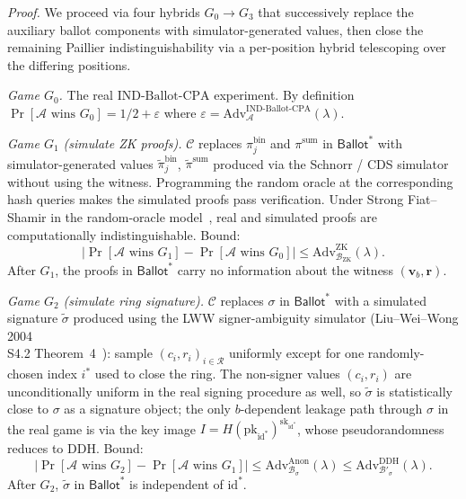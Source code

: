 \textit{Proof.} We proceed via four hybrids $G_0 \to G_3$ that successively replace the auxiliary ballot components with simulator-generated values, then close the remaining Paillier indistinguishability via a per-position hybrid telescoping over the differing positions.

\emph{Game $G_0$.} The real $\mathrm{IND\text{-}Ballot\text{-}CPA}$ experiment. By definition $\Pr[\mathcal{A} \text{ wins } G_0] = 1/2 + \varepsilon$ where $\varepsilon = \mathrm{Adv}^{\mathrm{IND\text{-}Ballot\text{-}CPA}}_{\mathcal{A}}(\lambda)$.

\emph{Game $G_1$ (simulate ZK proofs).} $\mathcal{C}$ replaces $\pi^{\text{bin}}_j$ and $\pi^{\text{sum}}$ in $\mathsf{Ballot}^*$ with simulator-generated values $\widetilde{\pi}^{\text{bin}}_j$, $\widetilde{\pi}^{\text{sum}}$ produced via the Schnorr / CDS simulator without using the witness. Programming the random oracle at the corresponding hash queries makes the simulated proofs pass verification. Under Strong Fiat--Shamir in the random-oracle model~\cite{bernhard2012,cramer1994or}, real and simulated proofs are computationally indistinguishable. Bound:
\begin{equation*}
    |\Pr[\mathcal{A} \text{ wins } G_1] - \Pr[\mathcal{A} \text{ wins } G_0]| \leq \mathrm{Adv}^{\mathrm{ZK}}_{\mathcal{B}_{\text{ZK}}}(\lambda).
\end{equation*}
After $G_1$, the proofs in $\mathsf{Ballot}^*$ carry no information about the witness $(\mathbf{v}_b, \mathbf{r})$.

\emph{Game $G_2$ (simulate ring signature).} $\mathcal{C}$ replaces $\sigma$ in $\mathsf{Ballot}^*$ with a simulated signature $\widetilde{\sigma}$ produced using the LWW signer-ambiguity simulator (Liu--Wei--Wong 2004 \\S4.2 Theorem~4~\cite{liu2004}): sample $(c_i, r_i)_{i \in \mathcal{R}}$ uniformly except for one randomly-chosen index $i^*$ used to close the ring. The non-signer values $(c_i, r_i)$ are uncondi\-tion\-al\-ly uniform in the real signing procedure as well, so $\widetilde{\sigma}$ is statistically close to $\sigma$ as a signature object; the only $b$-dependent leakage path through $\sigma$ in the real game is via the key image $I = H(\text{pk}_{\text{id}^*})^{\text{sk}_{\text{id}^*}}$, whose pseudorandomness reduces to DDH. Bound:
\begin{equation*}
    |\Pr[\mathcal{A} \text{ wins } G_2] - \Pr[\mathcal{A} \text{ wins } G_1]| \leq \mathrm{Adv}^{\mathrm{Anon}}_{\mathcal{B}_{\sigma}}(\lambda) \leq \mathrm{Adv}^{\mathrm{DDH}}_{\mathcal{B}'_{\sigma}}(\lambda).
\end{equation*}
After $G_2$, $\widetilde{\sigma}$ in $\mathsf{Ballot}^*$ is independent of $\text{id}^*$.

